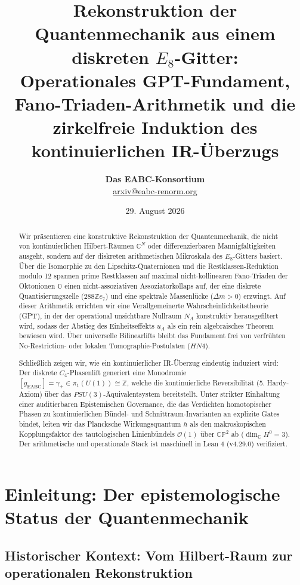 \documentclass[11pt,a4paper]{article}
\title{\textbf{Rekonstruktion der Quantenmechanik aus einem diskreten $E_8$-Gitter:}\\
\large Operationales GPT-Fundament, Fano-Triaden-Arithmetik und die zirkelfreie Induktion des kontinuierlichen IR-Überzugs}
\author{\textbf{Das EABC-Konsortium}\\
\small\href{mailto:arxiv@eabc-renorm.org}{arxiv@eabc-renorm.org}}
\date{29. August 2026}
\begin{document}
\maketitle

\begin{abstract}
Wir präsentieren eine konstruktive Rekonstruktion der Quantenmechanik, die nicht von kontinuierlichen Hilbert-Räumen $\mathbb{C}^N$ oder differenzierbaren Mannigfaltigkeiten ausgeht, sondern auf der diskreten arithmetischen Mikroskala des $E_8$-Gitters basiert. Über die Isomorphie zu den Lipschitz-Quaternionen und die Restklassen-Reduktion modulo 12 spannen prime Restklassen auf maximal nicht-kollinearen Fano-Triaden der Oktonionen $\mathbb{O}$ einen nicht-assoziativen Assoziatorkollaps auf, der eine diskrete Quantisierungszelle ($288\mathbb{Z}e_7$) und eine spektrale Massenlücke ($\Delta m > 0$) erzwingt. Auf dieser Arithmetik errichten wir eine Verallgemeinerte Wahrscheinlichkeitstheorie (GPT), in der der operational unsichtbare Nullraum $N_A$ konstruktiv herausgefiltert wird, sodass der Abstieg des Einheitseffekts $u_A$ als ein rein algebraisches Theorem bewiesen wird. Über universelle Bilinearlifts bleibt das Fundament frei von verfrühten No-Restriction- oder lokalen Tomographie-Postulaten ($HN4$). 

Schließlich zeigen wir, wie ein kontinuierlicher IR-Überzug eindeutig induziert wird: Der diskrete $C_4$-Phasenlift generiert eine Monodromie $[g_{\text{EABC}}] = \gamma_+ \in \pi_1(U(1)) \cong \mathbb{Z}$, welche die kontinuierliche Reversibilität (5. Hardy-Axiom) über das $PSU(3)$-Äquivalentsystem bereitstellt. Unter strikter Einhaltung einer auditierbaren Epistemischen Governance, die das Verdichten homotopischer Phasen zu kontinuierlichen Bündel- und Schnittraum-Invarianten an explizite Gates bindet, leiten wir das Plancksche Wirkungsquantum $h$ als den makroskopischen Kopplungsfaktor des tautologischen Linienbündels $\mathcal{O}(1)$ über $\mathbb{CP}^2$ ab ($\dim_{\mathbb{C}} H^0 = 3$). Der arithmetische und operationale Stack ist maschinell in Lean 4 (v4.29.0) verifiziert.
\end{abstract}

\tableofcontents

\newpage

\section{Einleitung: Der epistemologische Status der Quantenmechanik}

\subsection{Historischer Kontext: Vom Hilbert-Raum zur operationalen Rekonstruktion}
\end{document}
